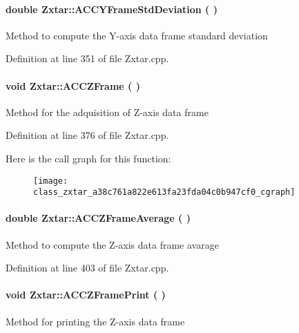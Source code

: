 \begin{appendices}
\paragraph[{\-A\-C\-C\-Y\-Frame\-Std\-Deviation}]{\setlength{\rightskip}{0pt plus 5cm}double {\bf \-Zxtar\-::\-A\-C\-C\-Y\-Frame\-Std\-Deviation} (
)}\label{class_zxtar_a2267ef2066394cd6fef0d75ad34cff9d}
\-Method to compute the \-Y-\/axis data frame standard deviation 

\-Definition at line 351 of file \-Zxtar.\-cpp.

\paragraph[{\-A\-C\-C\-Z\-Frame}]{\setlength{\rightskip}{0pt plus 5cm}void {\bf \-Zxtar\-::\-A\-C\-C\-Z\-Frame} (
)}\label{class_zxtar_a38c761a822e613fa23fda04c0b947cf0}
\-Method for the adquisition of \-Z-\/axis data frame 

\-Definition at line 376 of file \-Zxtar.\-cpp.



\-Here is the call graph for this function\-:\nopagebreak
\begin{figure}[H]
\begin{center}
\leavevmode
\texttt{[image: class\_zxtar\_a38c761a822e613fa23fda04c0b947cf0\_cgraph]}
\end{center}
\end{figure}


\paragraph[{\-A\-C\-C\-Z\-Frame\-Average}]{\setlength{\rightskip}{0pt plus 5cm}double {\bf \-Zxtar\-::\-A\-C\-C\-Z\-Frame\-Average} (
)}\label{class_zxtar_a20d5673fac7f757e102eb2642e4a8066}
\-Method to compute the \-Z-\/axis data frame avarage 

\-Definition at line 403 of file \-Zxtar.\-cpp.

\paragraph[{\-A\-C\-C\-Z\-Frame\-Print}]{\setlength{\rightskip}{0pt plus 5cm}void {\bf \-Zxtar\-::\-A\-C\-C\-Z\-Frame\-Print} (
)}\label{class_zxtar_a868b738a65e5b5cfd4fabe7677208a6e}
\-Method for printing the \-Z-\/axis data frame 


\end{appendices}
